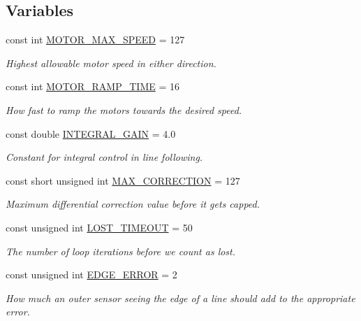 \subsection*{Variables}
\begin{DoxyCompactItemize}
\item 
const int \hyperlink{namespaceIDP_a4ead0b21ad2c507b542445695182d4cd}{MOTOR\_\-MAX\_\-SPEED} = 127
\begin{DoxyCompactList}\small\item\em Highest allowable motor speed in either direction. \item\end{DoxyCompactList}\item 
const int \hyperlink{namespaceIDP_ab3a00a6cc8a6dba271e38d337daf4703}{MOTOR\_\-RAMP\_\-TIME} = 16
\begin{DoxyCompactList}\small\item\em How fast to ramp the motors towards the desired speed. \item\end{DoxyCompactList}\item 
const double \hyperlink{namespaceIDP_a9107eef10d68ba30176633afd87f1ed4}{INTEGRAL\_\-GAIN} = 4.0
\begin{DoxyCompactList}\small\item\em Constant for integral control in line following. \item\end{DoxyCompactList}\item 
const short unsigned int \hyperlink{namespaceIDP_a246919caaacabcb0399802d542d8330b}{MAX\_\-CORRECTION} = 127
\begin{DoxyCompactList}\small\item\em Maximum differential correction value before it gets capped. \item\end{DoxyCompactList}\item 
const unsigned int \hyperlink{namespaceIDP_ac845248570cca0705d43e2dbb085c3cb}{LOST\_\-TIMEOUT} = 50
\begin{DoxyCompactList}\small\item\em The number of loop iterations before we count as lost. \item\end{DoxyCompactList}\item 
const unsigned int \hyperlink{namespaceIDP_afa01378acc238f4bd41d8eb304f7afd7}{EDGE\_\-ERROR} = 2
\begin{DoxyCompactList}\small\item\em How much an outer sensor seeing the edge of a line should add to the appropriate error. \item\end{DoxyCompactList}\end{DoxyCompactItemize}


